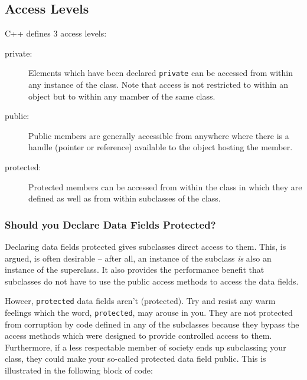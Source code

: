 
\subsection{Access Levels}

C++ defines 3 access levels:
\begin{description}
  \item[private:] Elements which have been declared \verb+private+ can be
                   accessed from within any instance of the class. Note
                   that access is not restricted to within an object but
                   to within any mamber of the same class.
  \item[public:] Public members are generally accessible from anywhere where
                 there is a handle (pointer or reference) available to the
                 object hosting the member.
  \item[protected:] Protected members can be accessed from within the class
                    in which they are defined as well as from within 
                    subclasses of the class. 
\end{description}


\subsubsection{Should you Declare Data Fields Protected?}                    

Declaring data fields protected gives subclasses direct access to them. This,
is argued, is often desirable -- after all, an instance of the subclass {\em is}
also an instance of the superclass. It also provides the performance benefit that
subclasses do not have to use the public access methods to access the data fields.

Howeer, \verb+protected+ data fields aren't
(protected). Try and resist any warm feelings which the word, \verb+protected+,
may arouse in you. They are not protected from corruption by code defined
in any of the subclasses because they bypass the access methods which were designed
to provide controlled access to them. Furthermore, if a less respectable member of society
ends up subclassing your class, they could make your so-called protected data
field public. This is illustrated in the following block of code:

